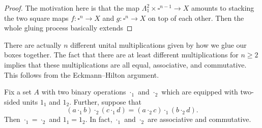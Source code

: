 \documentclass[../notes.tex]{subfiles}
\begin{document}
\begin{proof}
	The motivation here is that the map $\Lambda_1^2\times\square^{n-1}\to X$ amounts to stacking the two square maps $f\colon\square^n\to X$ and $g\colon\square^n\to X$ on top of each other. Then the whole gluing process basically extends 
\end{proof}
There are actually $n$ different unital multiplications given by how we glue our boxes together. The fact that there are at least different multiplications for $n\ge2$ implies that these multiplications are all equal, associative, and commutative. This follows from the Eckmann--Hilton argument.
\begin{lemma}
	Fix a set $A$ with two binary operations $\cdot_1$ and $\cdot_2$ which are equipped with two-sided units $1_1$ and $1_2$. Further, suppose that
	\[(a\cdot_1b)\cdot_2(c\cdot_1d)=(a\cdot_2c)\cdot_1(b\cdot_2d).\]
	Then ${\cdot_1}={\cdot_2}$ and $1_1=1_2$. In fact, $\cdot_1$ and $\cdot_2$ are associative and commutative.
\end{lemma}
\end{document}
